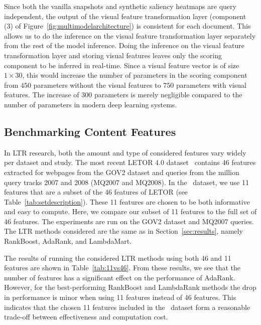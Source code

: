 Since both the vanilla snapshots and synthetic saliency heat\-maps are query independent, the output of the visual feature transformation layer (component (3) of Figure~\ref{fig:multimodelarchitecture}) is consistent for each document.
This allows us to do the inference on the visual feature transformation layer separately from the rest of the model inference.
Doing the inference on the visual feature transformation layer and storing visual features leaves only the scoring component to be inferred in real-time.
Since a visual feature vector is of size $1\times30$, this would increase the number of parameters in the scoring component from $450$ parameters without the visual features to $750$ parameters with visual features.
The increase of $300$ parameters is merely negligible compared to the number of parameters in modern deep learning systems.


\subsection{Benchmarking Content Features}
In \ac{LTR} research, both the amount and type of considered features vary widely per dataset and study.
The most recent LETOR 4.0 dataset~\cite{Qin2013:Introducing} contains 46 features extracted for webpages from the GOV2 dataset and queries from the million query tracks 2007 and 2008 (MQ2007 and MQ2008).
In the \datasetname~dataset, we use 11 features that are a subset of the 46 features of LETOR (see Table~\ref{tab:setdescription}).
These 11 features are chosen to be both informative and easy to compute.
Here, we compare our subset of 11 features to the full set of 46 features.
The experiments are run on the GOV2 dataset and MQ2007 queries.
The \ac{LTR} methods considered are the same as in Section~\ref{sec:results}, namely RankBoost, AdaRank, and LambdaMart.

The results of running the considered \ac{LTR} methods using both 46 and 11 features are shown in Table~\ref{tab:11vs46}.
From these results, we see that the number of features has a significant effect on the performance of AdaRank.
However, for the best-performing RankBoost and LambdaRank methods the drop in performance is minor when using 11 features instead of 46 features.
This indicates that the chosen 11 features included in the \datasetname~dataset form a reasonable trade-off between effectiveness and computation cost.

